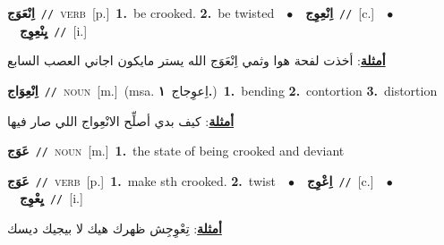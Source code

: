 \documentclass[10pt,a4paper,twoside]{article} %
\begin{document}
\begin{multicols}{2}
{\setlength\topsep{0pt}\textbf{\foreignlanguage{arabic}{اِنْعَوَج}}\ {\color{gray}\texttt{//}\color{black}}\ \textsc{verb}\ [p.]\ \textbf{1.}~be crooked.  \textbf{2.}~be twisted\ \ $\bullet$\ \ \setlength\topsep{0pt}\textbf{\foreignlanguage{arabic}{اِنْعِوِج}}\ {\color{gray}\texttt{//}\color{black}}\ [c.]\ \ $\bullet$\ \ \setlength\topsep{0pt}\textbf{\foreignlanguage{arabic}{يِنْعِوِج}}\ {\color{gray}\texttt{//}\color{black}}\ [i.]\  \begin{flushright}\color{gray}\foreignlanguage{arabic}{\textbf{\underline{\foreignlanguage{arabic}{أمثلة}}}: أخذت لفحة هوا وثمي اِنْعَوَج الله يستر مايكون اجاني العصب السابع}\end{flushright}\color{black}} \vspace{2mm}

{\setlength\topsep{0pt}\textbf{\foreignlanguage{arabic}{اِنْعِوَاج}}\ {\color{gray}\texttt{//}\color{black}}\ \textsc{noun}\ [m.]\ \color{gray}(msa. \foreignlanguage{arabic}{اِعوِجاج}~\foreignlanguage{arabic}{\textbf{١.}})\color{black}\ \textbf{1.}~bending  \textbf{2.}~contortion  \textbf{3.}~distortion\  \begin{flushright}\color{gray}\foreignlanguage{arabic}{\textbf{\underline{\foreignlanguage{arabic}{أمثلة}}}: كيف بدي أصلِّح الانْعِواج اللي صار فيها}\end{flushright}\color{black}} \vspace{2mm}

{\setlength\topsep{0pt}\textbf{\foreignlanguage{arabic}{عَوَج}}\ {\color{gray}\texttt{//}\color{black}}\ \textsc{noun}\ [m.]\ \textbf{1.}~the state of being crooked and deviant\ } \vspace{2mm}

{\setlength\topsep{0pt}\textbf{\foreignlanguage{arabic}{عَوَج}}\ {\color{gray}\texttt{//}\color{black}}\ \textsc{verb}\ [p.]\ \textbf{1.}~make sth crooked.  \textbf{2.}~twist\ \ $\bullet$\ \ \setlength\topsep{0pt}\textbf{\foreignlanguage{arabic}{اِعْوِج}}\ {\color{gray}\texttt{//}\color{black}}\ [c.]\ \ $\bullet$\ \ \setlength\topsep{0pt}\textbf{\foreignlanguage{arabic}{يِعْوِج}}\ {\color{gray}\texttt{//}\color{black}}\ [i.]\  \begin{flushright}\color{gray}\foreignlanguage{arabic}{\textbf{\underline{\foreignlanguage{arabic}{أمثلة}}}: تِعْوِجِش ظهرك هيك لا بيجيك ديسك}\end{flushright}\color{black}} \vspace{2mm}


\end{multicols}
\end{document}
